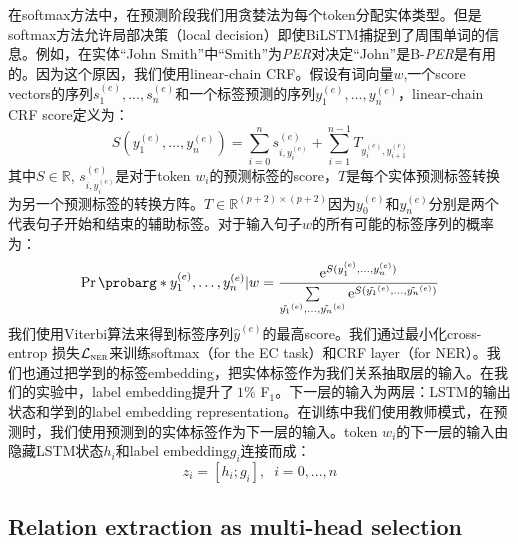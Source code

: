 \documentclass[a4paper,UTF8,no-math,zihao=-4]{ctexart}
\newcommand{\prob}{\operatorname{Pr}\probarg}
\begin{document}
	在softmax方法中，在预测阶段我们用贪婪法为每个token分配实体类型。但是softmax方法允许局部决策（local decision）即使BiLSTM捕捉到了周围单词的信息。例如，在实体“John Smith”中“Smith”为\emph{PER}对决定“John”是B-\emph{PER}是有用的。因为这个原因，我们使用linear-chain CRF。假设有词向量$w$,一个score vectors的序列$s_{1}^{(e)},...,s_{n}^{(e)}$和一个标签预测的序列$y_{1}^{(e)},...,y_{n}^{(e)}$，linear-chain CRF score定义为：\begin{equation}
	S\left(y_1^{(e)}, \ldots, y_n^{(e)}\right) =  \sum_{i=0}^{n} s_{i,y_i^{(e)}}^{(e)} + \sum_{i=1}^{n-1} T_{y_{i}^{(e)}, y_{i+1}^{(e)}} 
	\end{equation}其中$S\in\mathbb{R}$, $s_{i,y_i^{(e)}}^{(e)}$是对于token $ w_{i} $的预测标签的score，$ T $是每个实体预测标签转换为另一个预测标签的转换方阵。$T\in \mathbb{R}^{(p+2)\times (p+2)}$因为$y_0^{(e)}$和$y_n^{(e)}$分别是两个代表句子开始和结束的辅助标签。对于输入句子$w$的所有可能的标签序列的概率为：\begin{equation}
	\prob*{y_1^{(e)}, \ldots, y_n^{(e)} | w} = \frac{\mathrm{e}^{S(y_1^{(e)}, \ldots, y_n^{(e)})}}{\sum\limits_{\tilde{y_1}^{(e)}, \ldots, \tilde{y_n}^{(e)}} \mathrm{e}^{S(\tilde{y_1}^{(e)}, \ldots, \tilde{y_n}^{(e)})}}
	\end{equation}我们使用Viterbi算法来得到标签序列$\hat{y}^{(e)}$的最高score。我们通过最小化cross-entrop 损失$\mathcal{L}_{\textsc{ner}}$来训练softmax（for the EC task）和CRF layer（for NER）。我们也通过把学到的标签embedding，把实体标签作为我们关系抽取层的输入。在我们的实验中，label embedding提升了$~1$\% F$_1$。下一层的输入为两层：LSTM的输出状态和学到的label embedding representation。在训练中我们使用教师模式，在预测时，我们使用预测到的实体标签作为下一层的输入。token $w_i$的下一层的输入由隐藏LSTM状态$h_i$和label embedding$g_i$连接而成：
	 \begin{equation}
	z_i= [h_i;g_i],\;\; i=0,...,n
	\end{equation}
	
	\subsection{Relation extraction as multi-head selection}
	
\end{document}
